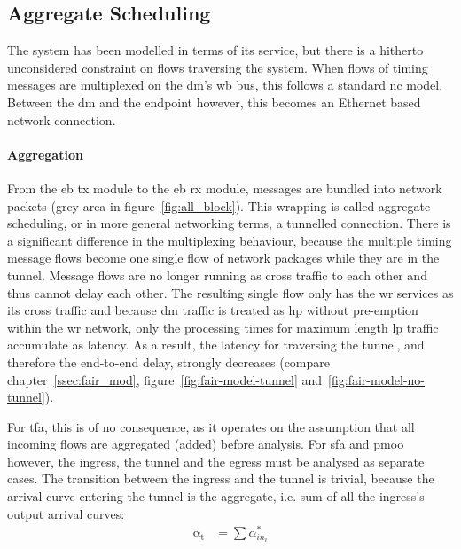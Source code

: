 \subsection{Aggregate Scheduling}
\label{ssec:tunnel}
The system has been modelled in terms of its service, but there is a hitherto unconsidered constraint on flows traversing the system. When flows of timing messages are multiplexed on the \gls{dm}'s \gls{wb} bus,
this follows a standard \gls{nc} model. Between the \gls{dm} and the endpoint however, this becomes an Ethernet based network connection.
\paragraph{Aggregation}
From the \gls{eb} \gls{tx} module to the \gls{eb} \gls{rx} module, messages are bundled into network packets (grey area in figure~\ref{fig:all_block}).
This wrapping is called aggregate scheduling, or in more general networking terms, a tunnelled connection. There is a significant difference in the multiplexing behaviour, because the multiple timing message flows become
one single flow of network packages while they are in the tunnel. Message flows are no longer running as cross traffic to each other and thus cannot delay each other.
The resulting single flow only has the \gls{wr} services as its cross traffic and because \gls{dm} traffic is treated as \gls{hp} without pre-emption within the \gls{wr} network, only the processing times for maximum length \gls{lp} traffic accumulate as latency.
As a result, the latency for traversing the tunnel, and therefore the end-to-end delay, strongly decreases (compare chapter~\ref{ssec:fair_mod}, figure~\ref{fig:fair-model-tunnel} and~\ref{fig:fair-model-no-tunnel}).
\par
For \gls{tfa}, this is of no consequence, as it operates on the assumption that all incoming flows are aggregated (added) before analysis.
For \gls{sfa} and \gls{pmoo} however, the ingress, the tunnel and the egress must be analysed as separate cases.
The transition between the ingress and the tunnel is trivial, because the arrival curve entering the tunnel is the aggregate, i.e. sum of all the ingress's output arrival curves:
%
\begin{align}
\mathrm{\alpha_t} &=  \sum \alpha^*_{{in}_i}
\label{eq:in_tu}
\end{align}
%
